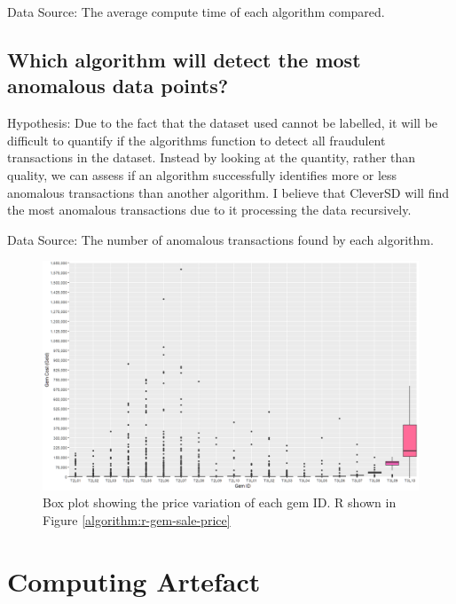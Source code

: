 \documentclass[journal]{IEEEtran}
\begin{document}
\noindent
Data Source: The average compute time of each algorithm compared.

\subsection{Which algorithm will detect the most anomalous data points?}
\noindent
Hypothesis: Due to the fact that the dataset used cannot be labelled, it will be difficult to quantify if the algorithms function to detect all fraudulent transactions in the dataset. Instead by looking at the quantity, rather than quality, we can assess if an algorithm successfully identifies more or less anomalous transactions than another algorithm. I believe that CleverSD will find the most anomalous transactions due to it processing the data recursively.

\noindent
Data Source: The number of anomalous transactions found by each algorithm.

\begin{figure}[b]
    \centering
    \includegraphics[width=12cm]{graph-gem-sale-prices.png}
    \caption{Box plot showing the price variation of each gem ID. R shown in Figure \ref{algorithm:r-gem-sale-price}}
    \label{graph:gem-sale-price}
\end{figure}

\section{Computing Artefact}
\end{document}
